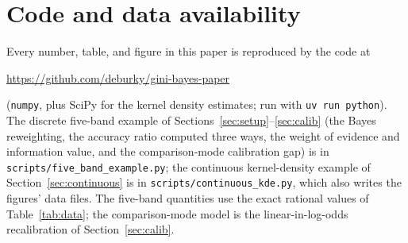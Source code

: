 \documentclass[12pt]{article}
\begin{document}
\appendix
\section{Code and data availability}\label{app:code}
Every number, table, and figure in this paper is reproduced by the code at
\begin{center}
\url{https://github.com/deburky/gini-bayes-paper}
\end{center}
(\texttt{numpy}, plus SciPy for the kernel density estimates; run with \texttt{uv run python}).
The discrete five-band example of Sections~\ref{sec:setup}--\ref{sec:calib} (the Bayes
reweighting, the accuracy ratio computed three ways, the weight of evidence and information
value, and the comparison-mode calibration gap) is in \texttt{scripts/five\_band\_example.py};
the continuous kernel-density example of Section~\ref{sec:continuous} is in
\texttt{scripts/continuous\_kde.py}, which also writes the figures' data files. The five-band
quantities use the exact rational values of Table~\ref{tab:data}; the comparison-mode model is
the linear-in-log-odds recalibration of Section~\ref{sec:calib}.
\end{document}
